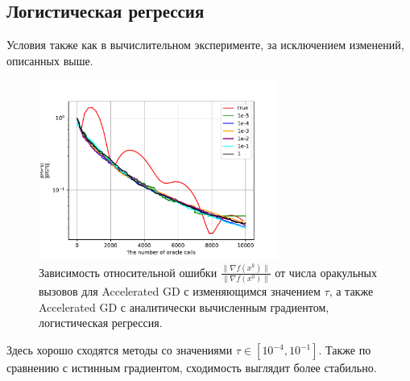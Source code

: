 \documentclass{article}
\begin{document}
\subsection{Логистическая регрессия}
Условия также как в вычислительном эксперименте, за исключением изменений, описанных выше.
\begin{figure}[!htbp]
\centering
  \includegraphics[width=0.7\textwidth]{../figures/Error_analysis_logreg_sigma=1e-6.pdf}
 \caption{Зависимость относительной ошибки $\frac{\|\nabla f(x^k)\|}{\|\nabla f(x^0)\|}$ от числа оракульных вызовов для Accelerated GD с изменяющимся значением $\tau$, а также Accelerated GD с аналитически вычисленным градиентом, логистическая регрессия.}
  \label{fig:error_logreg}
\end{figure}
Здесь хорошо сходятся методы со значениями $\tau \in [10^{-4}, 10^{-1}]$. Также по сравнению с истинным градиентом, сходимость выглядит более стабильно.


\end{document}
